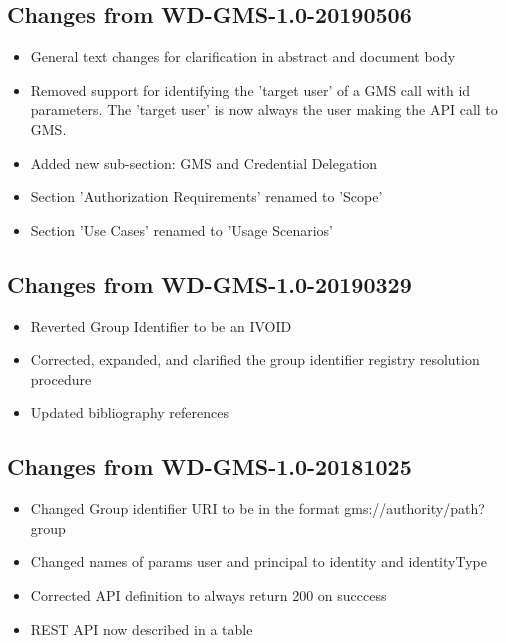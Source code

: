 \documentclass[11pt,a4paper]{ivoa}
\begin{document}
\subsection{Changes from WD-GMS-1.0-20190506}
\begin{itemize}
\item{General text changes for clarification in abstract and document body}
\item{Removed support for identifying the 'target user' of a GMS call with id parameters.  The 'target user' is now always the user making the API call to GMS.}
\item{Added new sub-section: GMS and Credential Delegation}
\item{Section 'Authorization Requirements' renamed to 'Scope'}
\item{Section 'Use Cases' renamed to 'Usage Scenarios'}
\end{itemize}

\subsection{Changes from WD-GMS-1.0-20190329}
\begin{itemize}
\item{Reverted Group Identifier to be an IVOID}
\item{Corrected, expanded, and clarified the group identifier registry resolution procedure}
\item{Updated bibliography references}
\end{itemize}

\subsection{Changes from WD-GMS-1.0-20181025}
\begin{itemize}
\item{Changed Group identifier URI to be in the format gms://authority/path?group}
\item{Changed names of params user and principal to identity and identityType}
\item{Corrected API definition to always return 200 on succcess}
\item{REST API now described in a table}
\end{itemize}



\end{document}
